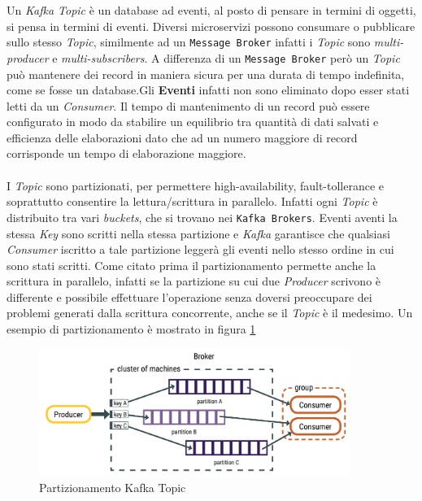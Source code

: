 Un \textit{Kafka Topic} è un database ad eventi, al posto di pensare in termini di oggetti, si pensa in termini di eventi.
Diversi microservizi possono consumare o pubblicare sullo stesso \textit{Topic}, similmente ad un \texttt{Message Broker} infatti i \textit{Topic} sono \textit{multi-producer} e \textit{multi-subscribers}.
A differenza di un \texttt{Message Broker} però un \textit{Topic} può mantenere dei record in maniera sicura per una durata di tempo indefinita, come se fosse un database.Gli \textbf{Eventi} infatti non sono eliminato dopo esser stati letti da un \textit{Consumer}. Il tempo di mantenimento di un record può essere configurato in modo da stabilire un equilibrio tra quantità di dati salvati e efficienza delle elaborazioni dato che ad un numero maggiore di record corrisponde un tempo di elaborazione maggiore.\\\\
I \textit{Topic} sono partizionati, per permettere high-availability, fault-tollerance e soprattutto consentire la lettura/scrittura in parallelo.
Infatti ogni \textit{Topic} è distribuito tra vari \textit{buckets}, che si trovano nei \texttt{Kafka Brokers}.
Eventi aventi la stessa \textit{Key} sono scritti nella stessa partizione e \textit{Kafka} garantisce che qualsiasi \textit{Consumer} iscritto a tale partizione leggerà gli eventi nello stesso ordine in cui sono stati scritti.
Come citato prima il partizionamento permette anche la scrittura in parallelo, infatti se la partizione su cui due \textit{Producer} scrivono è differente e possibile effettuare l'operazione senza doversi preoccupare dei problemi generati dalla scrittura concorrente, anche se il \textit{Topic} è il medesimo.
Un esempio di partizionamento è mostrato in figura \ref{fig:kafka_topic}
\begin{figure}[htbp]
    \centering
    \includegraphics[width=0.9\textwidth]{images/kafka/topic.png}
    \caption{Partizionamento Kafka Topic}
    \label{fig:kafka_topic}
\end{figure}

